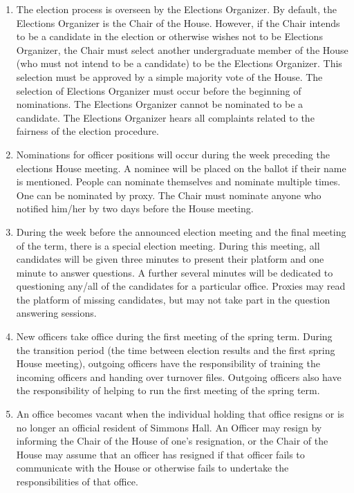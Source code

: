 \documentclass[letterpaper]{article}
\begin{document}
\begin{enumerate}
\begin{enumerate}
\begin{enumerate}
\item The election process is overseen by the Elections Organizer. By default, the Elections Organizer is the Chair of the House. However, if the Chair intends to be a candidate in the election or otherwise wishes not to be Elections Organizer, the Chair must select another undergraduate member of the House (who must not intend to be a candidate) to be the Elections Organizer. This selection must be approved by a simple majority vote of the House. The selection of Elections Organizer must occur before the beginning of nominations. The Elections Organizer cannot be nominated to be a candidate. The Elections Organizer hears all complaints related to the fairness of the election procedure.

\item Nominations for officer positions will occur during the week preceding the elections House meeting. A nominee will be placed on the ballot if their name is mentioned. People can nominate themselves and nominate multiple times. One can be nominated by proxy. The Chair must nominate anyone who notified him/her by two days before the House meeting.

\item During the week before the announced election meeting and the final meeting of the term, there is a special election meeting. During this meeting, all candidates will be given three minutes to present their platform and one minute to answer questions. A further several minutes will be dedicated to questioning any/all of the candidates for a particular office. Proxies may read the platform of missing candidates, but may not take part in the question answering sessions.

\item New officers take office during the first meeting of the spring term. During the transition period (the time between election results and the first spring House meeting), outgoing officers have the responsibility of training the incoming officers and handing over turnover files. Outgoing officers also have the responsibility of
helping to run the first meeting of the spring term.

\item An office becomes vacant when the individual holding that office resigns or is no longer an official resident of Simmons Hall. An Officer may resign by informing the Chair of the House of one's resignation, or the Chair of the House may assume that an officer has resigned if that officer fails to communicate with the House or otherwise fails to undertake the responsibilities of that office.


\end{enumerate}
\end{enumerate}
\end{enumerate}
\end{document}
